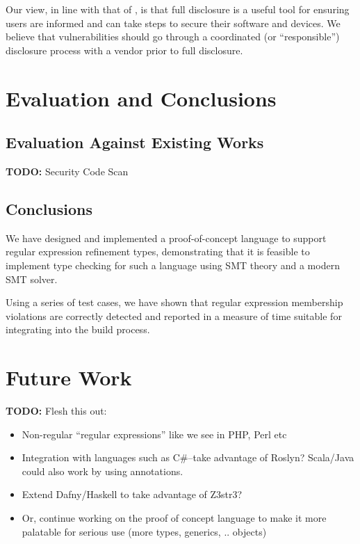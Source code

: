 \documentclass[a4paper,openany,12pt]{book}
\newcommand{\todobox}[1] {\colorbox{todocolor}{\parbox{\dimexpr \linewidth-\columnsep}{\vspace{.75\baselineskip}\centering\parbox{0.95\linewidth}{\faIcon{lightbulb} \textbf{TODO:} #1\vspace{.75\baselineskip}}}}}
\begin{document}
Our view, in line with that of \citeauthor{schneier2007fd}, is that full disclosure is a useful tool for ensuring users
are informed and can take steps to secure their software and devices.
We believe that vulnerabilities should go through a coordinated (or ``responsible'') disclosure process with a vendor
prior to full disclosure.

\chapter{Evaluation and Conclusions}

\section{Evaluation Against Existing Works}

\todobox{Security Code Scan}

\section{Conclusions}

We have designed and implemented a proof-of-concept language to support regular expression refinement types,
demonstrating that it is feasible to implement type checking for such a language using SMT theory and a modern
SMT solver.

Using a series of test cases, we have shown that regular expression membership violations are correctly detected
and reported in a measure of time suitable for integrating into the build process.

\chapter{Future Work}

\todobox{Flesh this out:\begin{itemize}
        \item Non-regular ``regular expressions'' like we see in PHP, Perl etc
        \item Integration with languages such as C\#--take advantage of Roslyn? Scala/Java could also work by using annotations.
        \item Extend Dafny/Haskell to take advantage of Z3str3?
        \item Or, continue working on the proof of concept language to make it more palatable for serious use
              (more types, generics, .. objects)
\end{itemize}}
\end{document}
